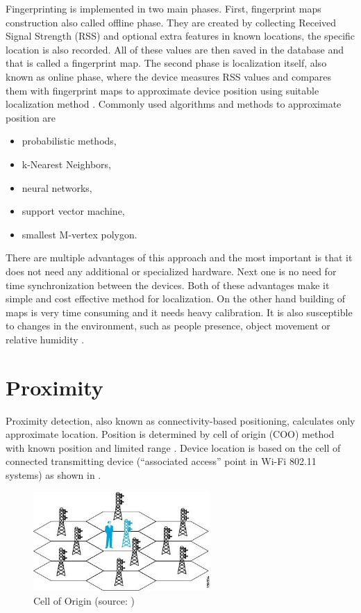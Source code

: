 Fingerprinting is implemented in two main phases. First, fingerprint maps construction also called offline phase. They are created by collecting Received Signal Strength (RSS) and optional extra features in known locations, the specific location is also recorded. All of these values are then saved in the database and that is called a fingerprint map. The second phase is localization itself, also known as online phase, where the device measures RSS values and compares them with fingerprint maps to approximate device position using suitable localization method \cite{LocalizationApproaches, ILWTP}. Commonly used algorithms and methods to approximate position are \cite{IILUBLEB}

\begin{itemize}
	\item probabilistic methods,
	\item k-Nearest Neighbors,
	\item neural networks,
	\item support vector machine,
	\item smallest M-vertex polygon.
\end{itemize}

There are multiple advantages of this approach and the most important is that it does not need any additional or specialized hardware. Next one is no need for time synchronization between the devices. Both of these advantages make it simple and cost effective method for localization. On the other hand building of maps is very time consuming and it needs heavy calibration. It is also susceptible to changes in the environment, such as people presence, object movement or relative humidity \cite{IILUBLEB, RSSFofIFD}.

\section{Proximity}\label{sec:Proximity}
Proximity detection, also known as connectivity-based positioning, calculates only approximate location. Position is determined by cell of origin (COO) method with known position and limited range \cite{RAinWILTaS}. Device location is based on the cell of connected transmitting device (\enquote{associated access} point in Wi-Fi 802.11 systems) as shown in  \cite{WiFiLBS}.

\begin{figure}[h!]
	\begin{centering}
		\includegraphics[width=0.6\textwidth]{img/cell_of_origin}
		\par\end{centering}
	\caption{Cell of Origin (source: \cite{WiFiLBS})\label{fig:CellOfOrigin}}
	\label{fig04c02}
\end{figure}

